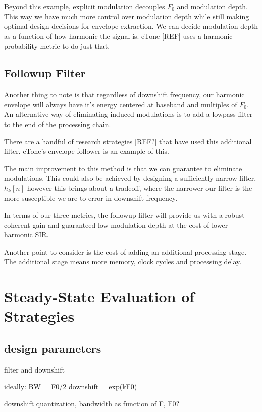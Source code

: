 \documentclass [11pt, proquest] {uwthesis}[2015/03/03]
\begin{document}
Beyond this example, explicit modulation decouples $F_0$ and modulation depth.  This way we have much more control over modulation depth while still making optimal design decisions for envelope extraction.  We can decide modulation depth as a function of how harmonic the signal is.  eTone [REF] uses a harmonic probability metric to do just that.

\subsection{Followup Filter}

Another thing to note is that regardless of downshift frequency, our harmonic envelope will always have it's energy centered at baseband and multiples of $F_0$.  An alternative way of eliminating induced modulations is to add a lowpass filter to the end of the processing chain.

There are a handful of research strategies [REF?] that have used this additional filter.  eTone's envelope follower is an example of this.

The main improvement to this method is that we can guarantee to eliminate modulations.  This could also be achieved by designing a sufficiently narrow filter, $h_k[n]$ however this brings about a tradeoff, where the narrower our filter is the more susceptible we are to error in downshift frequency.

In terms of our three metrics, the followup filter will provide us with a robust coherent gain and guaranteed low modulation depth at the cost of lower harmonic SIR.

Another point to consider is the cost of adding an additional processing stage.  The additional stage means more memory, clock cycles and processing delay.


\section{Steady-State Evaluation of Strategies}

\subsection{design parameters}

filter and downshift

ideally: 
BW = F0/2
downshift = exp(kF0)

downshift quantization, bandwidth as function of F, F0?
\end{document}
